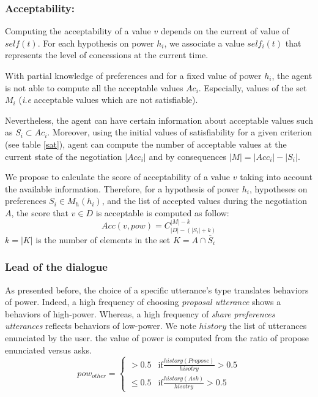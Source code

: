 \documentclass[conference, letterpaper]{IEEEtran}
\begin{document}
	\subsubsection{Acceptability:}
	Computing the acceptability of a value $v$ depends on the current of value of $self(t)$. For each hypothesis on power $h_i$, we associate a value $self_i(t)$ that represents the level of concessions at the current time. 
	
	With partial knowledge of preferences and for a fixed value of power $h_i$, the agent is not able to compute all the acceptable values $Ac_i$. Especially,   values of the set $M_i$ (\emph{i.e} acceptable values which are not satisfiable). 
	
	Nevertheless, the agent can have certain information about acceptable values such as $ S_i \subset Ac_i$. Moreover, using the initial values of satisfiability for a given criterion (see table \ref{sat}), agent can compute the number of acceptable values at the current state of the negotiation $|Acc_i|$ and by consequences $|M| = |Acc_i| - |S_i|$. 
	
	We propose to calculate the score of acceptability of a value $v$ taking into account the available information. Therefore, for a hypothesis of power $h_i$, hypotheses on preferences $S_i \in M_h(h_i)$,  and the list of accepted values during the negotiation $A$, the score that $v \in D$ is acceptable is computed as follow: 
	\begin{equation}
	Acc(v, pow) = C_{|D|-(|S_i| + k)}^{|M| - k}
	\end{equation}
	$k = |K| $ is the number of elements in the set $K = A \cap \overline S_i$
	
	
	\subsubsection{Lead of the dialogue}		
	As presented before, the choice of a specific utterance's type translates behaviors of power. Indeed, a high frequency of choosing \emph{proposal utterance} shows a behaviors of high-power. Whereas, a high frequency of \emph{share preferences utterances} reflects behaviors of low-power.
	We note $history$ the list of utterances enunciated by the user. the value of power is computed from the ratio of propose enunciated versus asks.
	\begin{equation}
	pow_{other} = \left\{\begin{array}{ll}
	> 0.5 & \mathrm{if } \frac{history(Propose)}{hisotry} > 0.5\\
	\leq 0.5 & \mathrm{if  } \frac{history(Ask)}{hisotry} > 0.5
	\end{array}\right.
	\end{equation}
	
\end{document}
